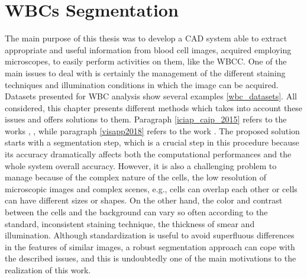 {	\chapter{WBCs Segmentation}
	\label{wbcs_segmentation}
	The main purpose of this thesis was to develop a CAD system able to extract appropriate and useful information from blood cell images, acquired employing microscopes, to easily perform activities on them, like the WBCC. One of the main issues to deal with is certainly the management of the different staining techniques and illumination conditions in which the image can be acquired. Datasets presented for WBC analysis show several examples \ref{wbc_datasets}.
	All considered, this chapter presents different methods which takes into account these issues and offers solutions to them. Paragraph \ref{iciap_caip_2015} refers to the works \cite{Put15c}, \cite{Put15d}, while paragraph \ref{visapp2018} refers to the work \cite{Porcu}.
	The proposed solution starts with a segmentation step, which is a crucial step in this procedure because its accuracy dramatically affects both the computational performances and the whole system overall accuracy. However, it is also a challenging problem to manage because of the complex nature of the cells, the low resolution of microscopic images and complex scenes, e.g., cells can overlap each other or cells can have different sizes or shapes. On the other hand, the color and contrast between the cells and the background can vary so often according to the standard, inconsistent staining technique, the thickness of smear and illumination. Although standardization is useful to avoid superfluous differences in the features of similar images, a robust segmentation approach can cope with the described issues, and this is undoubtedly one of the main motivations to the realization of this work.
}
